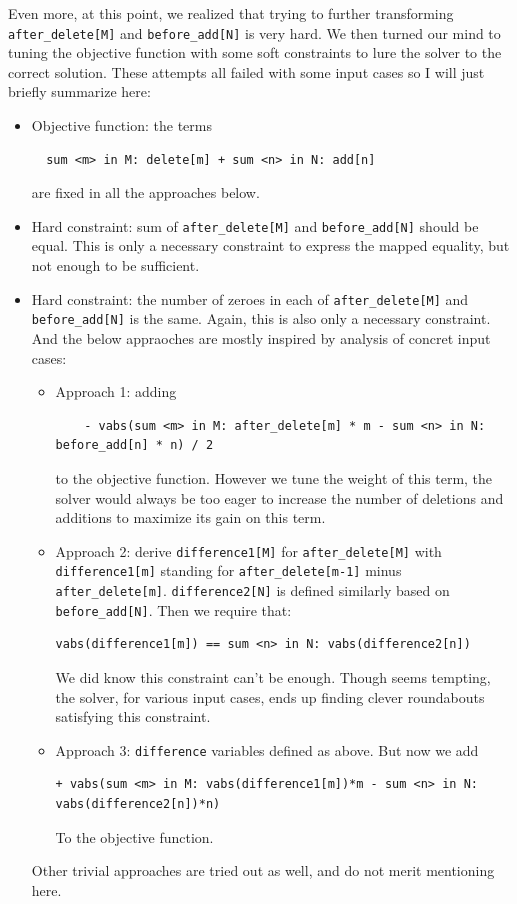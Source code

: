 \documentclass{article}
\begin{document}
Even more, at this point, we realized that trying to further transforming \texttt{after\_delete[M]} and \texttt{before\_add[N]} is very hard. We then turned our mind to tuning the objective function with some soft constraints to lure the solver to the correct solution. These attempts all failed with some input cases so I will just briefly summarize here:
\begin{itemize}
  \item Objective function: the terms
  \begin{lstlisting}
  sum <m> in M: delete[m] + sum <n> in N: add[n]
  \end{lstlisting}
   are fixed in all the approaches below. 
  \item Hard constraint: sum of \texttt{after\_delete[M]}  and \texttt{before\_add[N]} should be equal. This is only a necessary constraint to express the mapped equality, but not enough to be sufficient.
  \item Hard constraint: the number of zeroes in each of \texttt{after\_delete[M]} and \texttt{before\_add[N]} is the same. Again, this is also only a necessary constraint. \\

  And the below appraoches are mostly inspired by analysis of concret input cases:
  \begin{itemize}
    \item Approach 1: adding 
    \begin{lstlisting}
    - vabs(sum <m> in M: after_delete[m] * m - sum <n> in N: before_add[n] * n) / 2
    \end{lstlisting}
     to the objective function. However we tune the weight of this term, the solver would always be too eager to increase the number of deletions and additions to maximize its gain on this term.
    \item Approach 2: derive \texttt{difference1[M]} for \texttt{after\_delete[M]} with \texttt{difference1[m]} standing for \texttt{after\_delete[m-1]} minus \texttt{after\_delete[m]}. \texttt{difference2[N]} is defined similarly based on \texttt{before\_add[N]}. Then we require that:
    \begin{lstlisting}
vabs(difference1[m]) == sum <n> in N: vabs(difference2[n])
    \end{lstlisting}
    We did know this constraint can't be enough. Though seems tempting, the solver, for various input cases, ends up finding clever roundabouts satisfying this constraint. 
    \item Approach 3: \texttt{difference} variables defined as above. But now we add 
    \begin{lstlisting}
+ vabs(sum <m> in M: vabs(difference1[m])*m - sum <n> in N: vabs(difference2[n])*n)
    \end{lstlisting}
    To the objective function.
  \end{itemize}
  Other trivial approaches are tried out as well, and do not merit mentioning here. 
\end{itemize}
\end{document}
